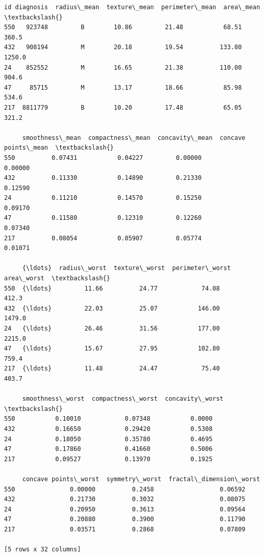 \documentclass[11pt]{article}
\begin{document}
    \begin{Verbatim}[commandchars=\\\{\}]
          id diagnosis  radius\_mean  texture\_mean  perimeter\_mean  area\_mean  \textbackslash{}
550   923748         B        10.86         21.48           68.51      360.5
432   908194         M        20.18         19.54          133.80     1250.0
24    852552         M        16.65         21.38          110.00      904.6
47     85715         M        13.17         18.66           85.98      534.6
217  8811779         B        10.20         17.48           65.05      321.2

     smoothness\_mean  compactness\_mean  concavity\_mean  concave points\_mean  \textbackslash{}
550          0.07431           0.04227         0.00000              0.00000
432          0.11330           0.14890         0.21330              0.12590
24           0.11210           0.14570         0.15250              0.09170
47           0.11580           0.12310         0.12260              0.07340
217          0.08054           0.05907         0.05774              0.01071

     {\ldots}  radius\_worst  texture\_worst  perimeter\_worst  area\_worst  \textbackslash{}
550  {\ldots}         11.66          24.77            74.08       412.3
432  {\ldots}         22.03          25.07           146.00      1479.0
24   {\ldots}         26.46          31.56           177.00      2215.0
47   {\ldots}         15.67          27.95           102.80       759.4
217  {\ldots}         11.48          24.47            75.40       403.7

     smoothness\_worst  compactness\_worst  concavity\_worst  \textbackslash{}
550           0.10010            0.07348           0.0000
432           0.16650            0.29420           0.5308
24            0.18050            0.35780           0.4695
47            0.17860            0.41660           0.5006
217           0.09527            0.13970           0.1925

     concave points\_worst  symmetry\_worst  fractal\_dimension\_worst
550               0.00000          0.2458                  0.06592
432               0.21730          0.3032                  0.08075
24                0.20950          0.3613                  0.09564
47                0.20880          0.3900                  0.11790
217               0.03571          0.2868                  0.07809

[5 rows x 32 columns]
    \end{Verbatim}
\end{document}
